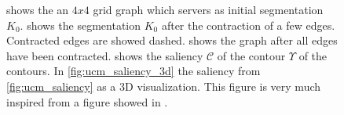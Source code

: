 \begin{figure}
{{    }%
    }%
    \caption[Ultra metric contour map saliency]{
         shows the an $4x4$ grid graph which servers as initial segmentation $K_0$.
         shows the segmentation $K_0$ after the contraction of a few edges.
        Contracted edges are showed dashed.
         shows the graph after all edges have been contracted.
         shows the saliency $\mathcal{C}$ of the contour $\Upsilon$ of the contours.
        In \cref{fig:ucm_saliency_3d} the saliency from \ref{fig:ucm_saliency} as a 3D visualization.
        This figure is very much inspired from a figure showed in \citep{arbelaez_2006_cvpr}.
    }\label{fig:ucm_visu}
\end{figure}




